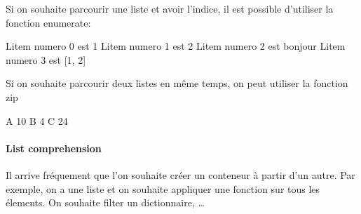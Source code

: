 \documentclass[letterpaper,10pt,english]{sphinxhowto}
\begin{document}
\sphinxAtStartPar
Si on souhaite parcourir une liste et avoir l’indice, il est possible d’utiliser la fonction enumerate:

\begin{sphinxVerbatim}[commandchars=\\\{\}]
    
\end{sphinxVerbatim}

\begin{sphinxVerbatim}[commandchars=\\\{\}]
L\PYGZsq{}item numero 0 est 1
L\PYGZsq{}item numero 1 est 2
L\PYGZsq{}item numero 2 est bonjour
L\PYGZsq{}item numero 3 est [1, 2]
\end{sphinxVerbatim}

\sphinxAtStartPar
Si on souhaite parcourir deux listes en même temps, on peut utiliser la fonction zip

\begin{sphinxVerbatim}[commandchars=\\\{\}]
  \PYG{p}{[}  \PYG{p}{]}
  \PYG{p}{[}  \PYG{p}{]}
     
     
\end{sphinxVerbatim}

\begin{sphinxVerbatim}[commandchars=\\\{\}]
A 10
B 4
C 24
\end{sphinxVerbatim}


\paragraph{List comprehension}
\label{\detokenize{cours3_conteneur_cours:list-comprehension}}
\sphinxAtStartPar
Il arrive fréquement que l’on souhaite créer un conteneur à partir d’un autre. Par exemple, on a une liste et on souhaite appliquer une fonction sur tous les élements. On souhaite filter un dictionnaire, …
\end{document}

